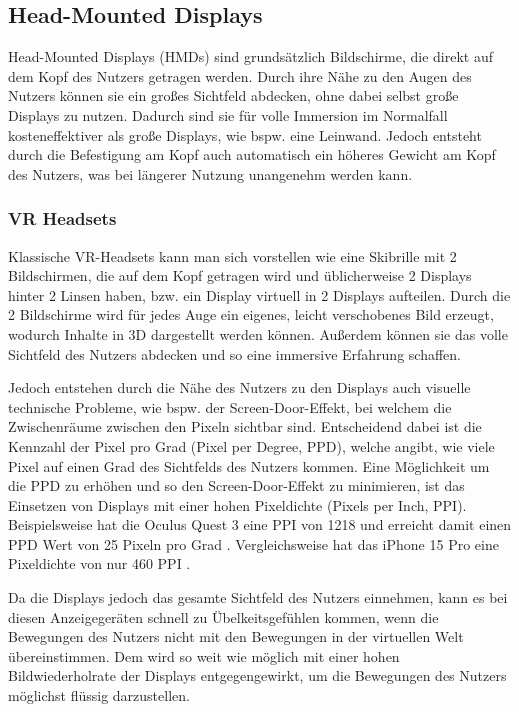   \subsection{Head-Mounted Displays}
    \label{section:hmds}
    Head-Mounted Displays (HMDs) sind grundsätzlich Bildschirme, die direkt auf dem Kopf des Nutzers getragen werden.
    Durch ihre Nähe zu den Augen des Nutzers können sie ein großes Sichtfeld abdecken, ohne dabei selbst große Displays zu nutzen.
    Dadurch sind sie für volle Immersion im Normalfall kosteneffektiver als große Displays, wie bspw. eine Leinwand.
    Jedoch entsteht durch die Befestigung am Kopf auch automatisch ein höheres Gewicht am Kopf des Nutzers, was bei längerer Nutzung unangenehm werden kann.


    \subsubsection{VR Headsets}

    Klassische VR-Headsets kann man sich vorstellen wie eine Skibrille mit 2 Bildschirmen, die auf dem Kopf getragen wird und üblicherweise 2 Displays hinter 2 Linsen haben, bzw. ein Display virtuell in 2 Displays aufteilen.
    Durch die 2 Bildschirme wird für jedes Auge ein eigenes, leicht verschobenes Bild erzeugt, wodurch Inhalte in 3D dargestellt werden können.
    Außerdem können sie das volle Sichtfeld des Nutzers abdecken und so eine immersive Erfahrung schaffen.

    Jedoch entstehen durch die Nähe des Nutzers zu den Displays auch visuelle technische Probleme, wie bspw. der Screen-Door-Effekt, bei welchem die Zwischenräume zwischen den Pixeln sichtbar sind.
    Entscheidend dabei ist die Kennzahl der Pixel pro Grad (Pixel per Degree, PPD), welche angibt, wie viele Pixel auf einen Grad des Sichtfelds des Nutzers kommen.
    Eine Möglichkeit um die PPD zu erhöhen und so den Screen-Door-Effekt zu minimieren, ist das Einsetzen von Displays mit einer hohen Pixeldichte (Pixels per Inch, PPI).
    Beispielsweise hat die Oculus Quest 3 eine PPI von 1218 und erreicht damit einen PPD Wert von 25 Pixeln pro Grad \autocite[]{meta-quest-3}.
    Vergleichsweise hat das iPhone 15 Pro eine Pixeldichte von nur 460 PPI \autocite[]{iPhone15Pro-datenblatt}.

    Da die Displays jedoch das gesamte Sichtfeld des Nutzers einnehmen, kann es bei diesen Anzeigegeräten schnell zu Übelkeitsgefühlen kommen, wenn die Bewegungen des Nutzers nicht mit den Bewegungen in der virtuellen Welt übereinstimmen.
    Dem wird so weit wie möglich mit einer hohen Bildwiederholrate der Displays entgegengewirkt, um die Bewegungen des Nutzers möglichst flüssig darzustellen.

